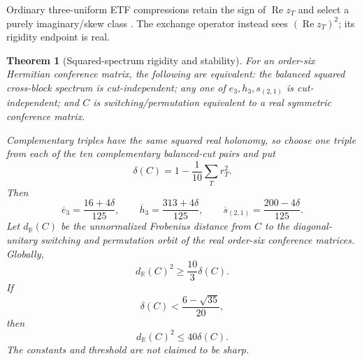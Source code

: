 \documentclass[11pt]{article}
\newtheorem{theorem}{Theorem}[section]
\theoremstyle{remark}
\begin{document}
Ordinary three-uniform ETF compressions retain the sign of
\(\operatorname{Re}z_T\) and select a purely imaginary/skew class
\cite{BodmannPaulsen,HoffmanSolazzo}.  The exchange operator instead sees
\((\operatorname{Re}z_T)^2\); its rigidity endpoint is real.

\begin{theorem}[Squared-spectrum rigidity and stability]
\label{thm:squared-rigidity}
For an order-six Hermitian conference matrix, the following are equivalent:
the balanced squared cross-block spectrum is cut-independent; any one of
\(e_3,h_3,s_{(2,1)}\) is cut-independent; and \(C\) is switching/permutation
equivalent to a real symmetric conference matrix.

Complementary triples have the same squared real holonomy, so choose one
triple from each of the ten complementary balanced-cut pairs and put
\[
 \delta(C)=1-\frac1{10}\sum_T r_T^2.
\]
Then
\[
 \overline e_3=\frac{16+4\delta}{125},\qquad
 \overline h_3=\frac{313+4\delta}{125},\qquad
 \overline{s}_{(2,1)}=\frac{200-4\delta}{125}.
\]
Let \(d_{\mathbb R}(C)\) be the unnormalized Frobenius distance from \(C\)
to the diagonal-unitary switching and permutation orbit of the real order-six
conference matrices.  Globally,
\begin{equation}
\label{eq:stability-lower}
 d_{\mathbb R}(C)^2\ge\frac{10}{3}\delta(C).
\end{equation}
If
\begin{equation}
\label{eq:stability-threshold}
 \delta(C)<\frac{6-\sqrt{35}}{20},
\end{equation}
then
\begin{equation}
\label{eq:stability-upper}
 d_{\mathbb R}(C)^2\le40\delta(C).
\end{equation}
The constants and threshold are not claimed to be sharp.
\end{theorem}
\end{document}

